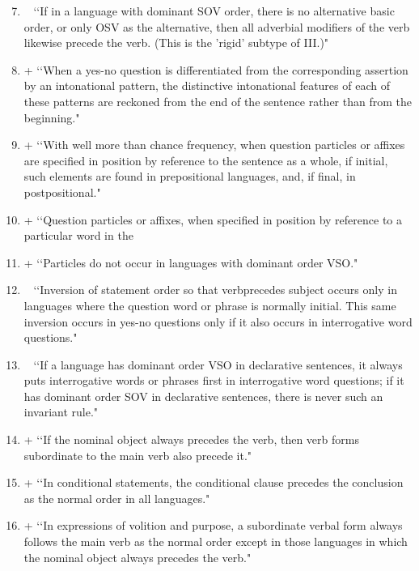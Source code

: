 \begin{enumerate}
\setcounter{enumi}{6}
\item ~  \lq\lq If in a language with dominant SOV order, there is no alternative basic order, or only OSV as the alternative, then all adverbial modifiers of the verb likewise precede the verb. (This is the 'rigid' subtype of III.)" 

\item +  \lq\lq When a yes-no question is differentiated from the corresponding assertion by an intonational pattern, the distinctive intonational features of each of these patterns are reckoned from the end of the sentence rather than from the beginning." 

\item +  \lq\lq With well more than chance frequency, when question particles or affixes are specified in position by reference to the sentence as a whole, if initial, such elements are found  in prepositional languages, and, if final, in postpositional." 

\item +  \lq\lq Question particles or affixes, when specified in position by reference to a particular word in the  

\item +  \lq\lq Particles do not occur in languages with dominant order VSO." 

\item ~  \lq\lq Inversion of statement order so that verbprecedes subject occurs only in languages where the question word or phrase is normally initial. This same inversion occurs in yes-no questions only if it also occurs in interrogative word questions." 

\item ~  \lq\lq If a language has dominant order VSO in declarative sentences, it always puts interrogative words or phrases first in interrogative word questions; if it has dominant order SOV in declarative sentences, there is never such an invariant rule." 

\item +  \lq\lq If the nominal object always precedes the verb, then verb forms subordinate to the main verb also precede it." 

\item +  \lq\lq In conditional statements, the conditional clause precedes the conclusion as the normal order in all languages." 

\item +  \lq\lq In expressions of volition and purpose, a subordinate verbal form always follows the main verb as the normal order except in those languages in which the nominal object always precedes the verb." 


\end{enumerate}
